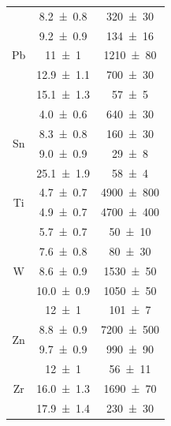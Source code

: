 \begin{table}[H]
\begin{tabular}{c|c|c}
\multirow{5}{*}{Pb} & \num{8.2\pm 0.8} & \num{320\pm 30} \\ & \num{9.2\pm 0.9} & \num{134\pm 16} \\ & \num{11\pm 1} & \num{1210\pm 80} \\ & \num{12.9\pm 1.1} & \num{700\pm 30} \\ & \num{15.1\pm 1.3} & \num{57\pm 5} \\\hline
\multirow{4}{*}{Sn} & \num{4.0\pm 0.6} & \num{640\pm 30} \\ & \num{8.3\pm 0.8} & \num{160\pm 30} \\ & \num{9.0\pm 0.9} & \num{29\pm 8} \\ & \num{25.1\pm 1.9} & \num{58\pm 4} \\\hline
\multirow{2}{*}{Ti} & \num{4.7\pm 0.7} & \num{4900\pm 800} \\ & \num{4.9\pm 0.7} & \num{4700\pm 400} \\\hline
\multirow{5}{*}{W} & \num{5.7\pm 0.7} & \num{50\pm 10} \\ & \num{7.6\pm 0.8} & \num{80\pm 30} \\ & \num{8.6\pm 0.9} & \num{1530\pm 50} \\ & \num{10.0\pm 0.9} & \num{1050\pm 50} \\ & \num{12\pm 1} & \num{101\pm 7} \\\hline
\multirow{2}{*}{Zn} & \num{8.8\pm 0.9} & \num{7200\pm 500} \\ & \num{9.7\pm 0.9} & \num{990\pm 90} \\\hline
\multirow{3}{*}{Zr} & \num{12\pm 1} & \num{56\pm 11} \\ & \num{16.0\pm 1.3} & \num{1690\pm 70} \\ & \num{17.9\pm 1.4} & \num{230\pm 30} \\\hline

    \end{tabular}
\end{table}\newpage
